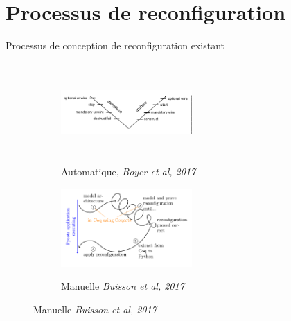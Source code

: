 \section{Processus de reconfiguration} 

\begin{frame}{Processus de conception de reconfiguration existant}
\begin{figure}
\begin{subfigure}[b]{0.45\textwidth} %
\includegraphics[width=5cm, height=3.8cm]{imgs/boyer_protocole}
\caption{Automatique, \emph{Boyer et al, 2017}}\label{fig:orchid}
\end{subfigure}
\begin{subfigure}[b]{0.45\textwidth} %
\includegraphics[width=5cm]{imgs/buisson_approche}\\
\caption{Manuelle \emph{Buisson et al, 2017}}\label{fig:orchid}
\end{subfigure}
\end{figure}
\end{frame}

